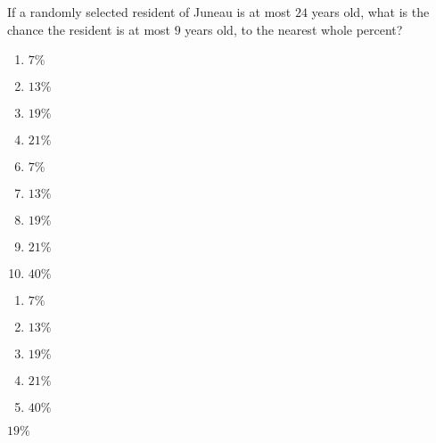 If a randomly selected resident of Juneau is at most $24$ years old, what is the chance the resident is at most $9$ years old, to the nearest whole percent?


\ifsat
	\begin{enumerate}[label=\Alph*)]
		\item $7\%$
		\item $13\% $ 
		\item $19\% $ %
		\item $21\% $ 
	\end{enumerate}
\else
\fi

\ifacteven
	\begin{enumerate}[label=\textbf{\Alph*.},itemsep=\fill,align=left]
		\setcounter{enumii}{5}
		\item $7\%$
		\item $13\% $ 
		\item $19\% $ %
		\addtocounter{enumii}{1}
		\item $21\% $ 
		\item $40\% $ 
	\end{enumerate}
\else
\fi

\ifactodd
	\begin{enumerate}[label=\textbf{\Alph*.},itemsep=\fill,align=left]
		\item $7\%$
		\item $13\% $ 
		\item $19\% $ %
		\item $21\% $ 
		\item $40\% $ 
	\end{enumerate}
\else
\fi

\ifgridin
 $19\% $ %
		
\else
\fi

